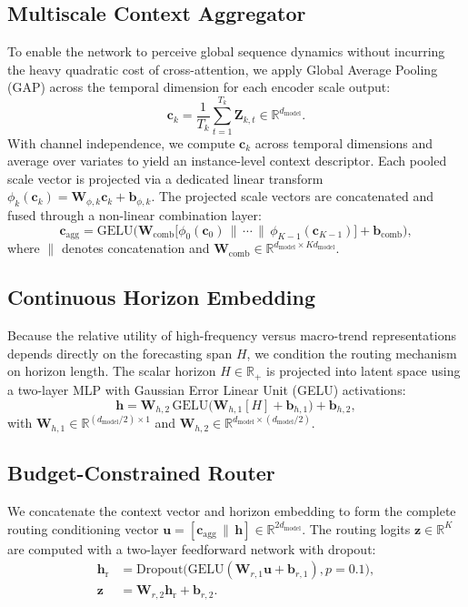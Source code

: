 \documentclass[journal]{IEEEtran}
\begin{document}
\subsection{Multiscale Context Aggregator}
To enable the network to perceive global sequence dynamics without incurring the heavy quadratic cost of cross-attention, we apply Global Average Pooling (GAP) across the temporal dimension for each encoder scale output:
\begin{equation}
\mathbf{c}_k = \frac{1}{T_k}\sum_{t=1}^{T_k}\mathbf{Z}_{k,t}\in\mathbb{R}^{d_{\text{model}}} .
\end{equation}
With channel independence, we compute $\mathbf{c}_k$ across temporal dimensions and average over variates to yield an instance-level context descriptor. Each pooled scale vector is projected via a dedicated linear transform $\phi_k(\mathbf{c}_k) = \mathbf{W}_{\phi,k} \mathbf{c}_k + \mathbf{b}_{\phi,k}$. The projected scale vectors are concatenated and fused through a non-linear combination layer:
\begin{equation}
\mathbf{c}_{\text{agg}} = \mathrm{GELU}\Big(\mathbf{W}_{\text{comb}}\big[\phi_0(\mathbf{c}_0)\,\|\,\cdots\,\|\,\phi_{K-1}(\mathbf{c}_{K-1})\big]+\mathbf{b}_{\text{comb}}\Big),
\end{equation}
where $\|$ denotes concatenation and $\mathbf{W}_{\text{comb}}\in\mathbb{R}^{d_{\text{model}}\times Kd_{\text{model}}}$.

\subsection{Continuous Horizon Embedding}
Because the relative utility of high-frequency versus macro-trend representations depends directly on the forecasting span $H$, we condition the routing mechanism on horizon length. The scalar horizon $H \in \mathbb{R}_+$ is projected into latent space using a two-layer MLP with Gaussian Error Linear Unit (GELU) activations:
\begin{equation}
\mathbf{h}=\mathbf{W}_{h,2}\,\mathrm{GELU}\big(\mathbf{W}_{h,1}[H]+\mathbf{b}_{h,1}\big)+\mathbf{b}_{h,2},
\end{equation}
with $\mathbf{W}_{h,1}\in\mathbb{R}^{(d_{\text{model}}/2)\times 1}$ and $\mathbf{W}_{h,2}\in\mathbb{R}^{d_{\text{model}}\times (d_{\text{model}}/2)}$.

\subsection{Budget-Constrained Router}
We concatenate the context vector and horizon embedding to form the complete routing conditioning vector $\mathbf{u}=[\mathbf{c}_{\text{agg}}\,\|\,\mathbf{h}] \in \mathbb{R}^{2 d_{\text{model}}}$. The routing logits $\mathbf{z} \in \mathbb{R}^K$ are computed with a two-layer feedforward network with dropout:
\begin{align}
\mathbf{h}_{\text{r}} &= \mathrm{Dropout}\big(\mathrm{GELU}(\mathbf{W}_{r,1}\mathbf{u}+\mathbf{b}_{r,1}), p=0.1\big),\\
\mathbf{z} &= \mathbf{W}_{r,2}\mathbf{h}_{\text{r}}+\mathbf{b}_{r,2}.
\end{align}
\end{document}
